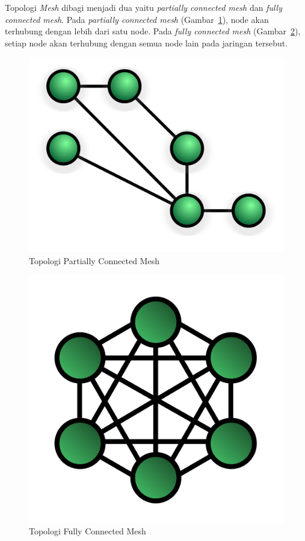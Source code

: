 \documentclass[a4paper,twoside]{article}
\begin{document}
\begin{enumerate}
\begin{itemize}
\begin{itemize}
Topologi \textit{Mesh} dibagi menjadi dua yaitu \textit{partially connected mesh} dan \textit{fully connected mesh}. Pada \textit{partially connected mesh} (Gambar~\ref{fig:mesh_partial}), node akan terhubung dengan lebih dari satu node. Pada \textit{fully connected mesh} (Gambar~\ref{fig:mesh_fully}), setiap node akan terhubung dengan semua node lain pada jaringan tersebut.
\begin{figure} [H]
	\centering  
	\includegraphics[scale=0.07]{Gambar/mesh_partial}  
	\caption[Topologi Partially Connected Mesh]{Topologi Partially Connected Mesh} 
	\label{fig:mesh_partial} 
\end{figure} 
\begin{figure} [H]
	\centering  
	\includegraphics[scale=0.07]{Gambar/mesh_fully}  
	\caption[Topologi Fully Connected Mesh]{Topologi Fully Connected Mesh} 
	\label{fig:mesh_fully} 
\end{figure}


\end{itemize}
\end{itemize}
\end{enumerate}
\end{document}
